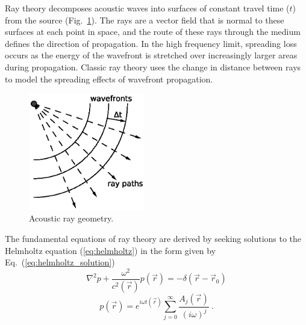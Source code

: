 \documentclass{ws-jca}
\begin{document}
Ray theory decomposes acoustic waves into surfaces of constant travel time
(\(t\)) from the source (Fig.~\ref{fig:geometry}). The rays are a vector
field that is normal to these surfaces at each point in space, and the route of
these rays through the medium defines the direction of propagation. In the
high frequency limit, spreading loss occurs as the energy of the wavefront
is stretched over increasingly larger areas during propagation. Classic ray
theory uses the change in distance between rays to model the spreading
effects of wavefront propagation.
\begin{figure}[th]
	\centerline{\includegraphics[width=2in]{AcousticRayGeometry.eps}} 
	\vspace*{8pt}
	\caption{Acoustic ray geometry.  \label{fig:geometry}}
\end{figure}
The fundamental equations of ray theory are derived\cite{Jensen1994} by
seeking solutions to the Helmholtz equation (\ref{eq:helmholtz}) in the
form given by Eq.~(\ref{eq:helmholtz_solution})
\begin{equation}
	\nabla^2p + \frac{\omega^2}{c^2(\vec{r})} p(\vec{r}) 
		= -\delta(\vec{r}-\vec{r}_0)
	\label{eq:helmholtz}
\end{equation}
\begin{equation}
	p(\vec{r}) = e^{i \omega t(\vec{r}) } 
		\sum_{j=0}^{\infty} \frac{ A_j(\vec{r}) }{(i\omega)^j} \:.
	\label{eq:helmholtz_solution}
\end{equation}
\end{document}
